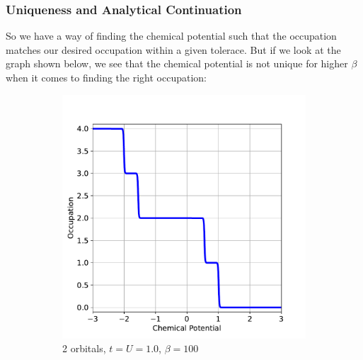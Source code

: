 \documentclass[12pt]{article}
\begin{document}
\subsubsection*{Uniqueness and Analytical Continuation}
So we have a way of finding the chemical potential such that the occupation matches our desired occupation within a given tolerace. But if we look at the graph shown below, we see that the chemical potential is not unique for higher $\beta$ when it comes to finding the right occupation:
\begin{figure}[h!]
  \centering
  \begin{subfigure}[b]{0.45\textwidth}
    \includegraphics[width=\textwidth]{o2100.pdf}
    \caption{2 orbitals, $t=U=1.0$, $\beta = 100$}
  \end{subfigure}
  \hspace{0.02\textwidth}
  \begin{subfigure}[b]{0.45\textwidth}

\end{subfigure}
\end{figure}
\end{document}
